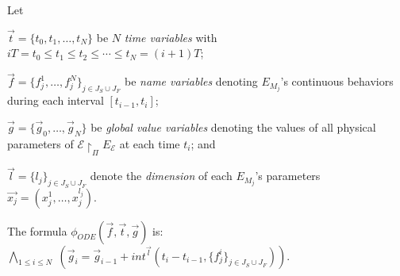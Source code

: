 \begin{definition}
Let
\begin{inparaenum}[(i)]
	\item $\vec{t} = \{t_0,t_1,\ldots,t_N\}$ be  $N$ \emph{time variables} 
	with $iT = t_0 \leq t_1 \leq t_2 \leq \cdots \leq t_N = (i+1)T$;
%
	\item $\vec{f} = \{f_j^1,\ldots,f_j^N\}_{j \in J_S \cup J_F}$ be \emph{name variables} 
	denoting $E_{M_j}$'s continuous behaviors during each interval $[t_{i-1},t_i]$;
%
	\item $\vec{g} = \{\vec{g}_0,\ldots,\vec{g}_N\}$ be \emph{global value variables}
	denoting the values of all physical parameters of $\mathcal{E} \restriction_{\Pi} E_\mathcal{E}$ at each time $t_i$; and
%
	\item $\vec{l} = \{l_j\}_{j \in J_S \cup J_F}$ denote the \emph{dimension}
	of each $E_{M_j}$'s parameters $\vec{x_j} = (x_j^1,\ldots,x_j^{l_j})$.
\end{inparaenum}
The formula
$\phi_{\mathit{ODE}}(\vec{f},\vec{t},\vec{g})$ is: %
$\bigwedge_{1 \leq i \leq N}\;
(\vec{g}_{i} = \vec{g}_{i-1} + 
\mathit{int}^{\vec{l}}(t_{i} - t_{i-1}, \{f_j^i\}_{j \in J_S \cup J_F}))$.
\end{definition}



